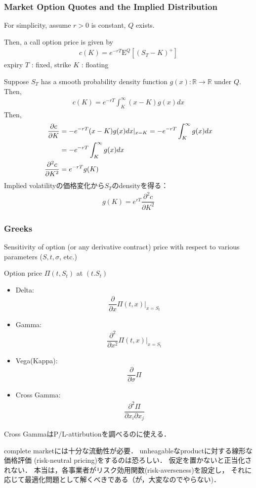 \documentclass[a4paper,11pt]{jsarticle}
\theoremstyle{definition}
\newcommand{\pd}[2]{\dfrac{\partial #1}{\partial #2}}
\newcommand{\pdd}[2]{\dfrac{{\partial}^2 #1} {\partial {#2}^2} }
\newcommand{\df}[2]{\dfrac{#1}{#2}}
\begin{document}
\subsubsection{Market Option Quotes and the Implied Distribution}
For simplicity, assume $r>0$ is constant, $Q$ exists.

Then, a call option price is given by
\begin{align}
  c(K)=e^{-rT}\mathrm{E}^Q[(S_T-K)^{+}]
\end{align}
expiry $T$ : fixed, strike $K$ : floating

Suppose $S_T$ has a smooth probability density function
$g(x) : \mathbb{R}\to\mathbb{R}$ under $Q$. Then,
\begin{align}
  c(K)=e^{-rT}\int_K^{\infty} (x-K)g(x)dx
\end{align}
Then,
\begin{align}
  \pd{c}{K}&=-e^{-rT}(x-K)g(x)dx|_{x=K}
  =-e^{-rT}\int_K^{\infty}g(x)dx \notag \\
  &=-e^{-rT}\int_K^{\infty}g(x)dx \\
  \pdd{c}{K}&=e^{-rT}g(K)
\end{align}
Implied volatilityの価格変化から$S_T$のdensityを得る：
\begin{align}
  g(K)=e^{rT}\pdd{c}{K}
\end{align}

\subsubsection{Greeks}
Sensitivity of option (or any derivative contract) price
with respect to various parameters ($S,t,\sigma$, etc.)

Option price $\Pi(t,S_t)$ at $(t.S_t)$

\begin{itemize}
  \item Delta:
  \begin{align}
    \pd{}{x}\Pi(t,x)|_{x=S_t}
  \end{align}
  \item Gamma:
  \begin{align}
    \pdd{}{x} \Pi(t,x)|_{x=S_t}
  \end{align}
  \item Vega(Kappa):
  \begin{align}
    \pd{}{\sigma} \Pi
  \end{align}
  \item Cross Gamma:
  \begin{align}
    \df{\partial^2 \Pi}{\partial x_i \partial x_j}
  \end{align}
\end{itemize}

Cross GammaはP/L-attirbutionを調べるのに使える．


complete marketには十分な流動性が必要．
unheagableなproductに対する線形な価格評価
(risk-neutral pricing)をするのは恐ろしい．
仮定を置かないと正当化されない．
本当は，各事業者がリスク効用関数(risk-averseness)を設定し，
それに応じて最適化問題として解くべきである（が，大変なのでやらない)．
\end{document}
